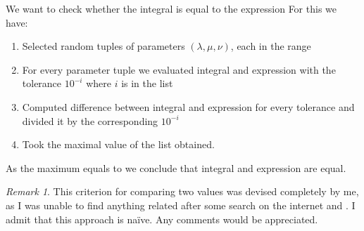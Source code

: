 \documentclass[a4paper]{article}
\theoremstyle{remark}
\newtheorem{remark}{Remark}
\begin{document}
We want to check whether the integral
is equal to the expression
For this we have:
\begin{enumerate}
	\item 
Selected 
random tuples of parameters $(\lambda,\mu,\nu)$, each in the range
\item For every parameter tuple we evaluated integral and expression with the tolerance $10^{-i}$ where $i$ is in the list
\item Computed difference between integral and expression for every tolerance and divided it by the corresponding $10^{-i}$
\item Took the maximal value of the list obtained.
\end{enumerate}
As the maximum equals to
we conclude that integral and expression are equal.
\begin{remark}
	This criterion for comparing two values was devised completely by me, as I was unable to find anything related after some search on the internet and \cite{teukolsky1992numerical}.
	I admit that this approach is na\"ive. Any comments would be appreciated.
\end{remark}
	
	
\end{document}
